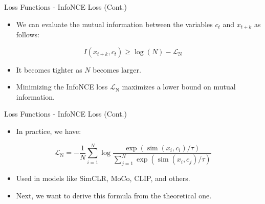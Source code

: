 \documentclass[serif, aspectratio=169]{beamer}
\begin{document}
\begin{frame}{Loss Functions - InfoNCE Loss (Cont.)}
     \begin{itemize}
         \item We can evaluate the mutual information between the variables $c_t$ and $x_{t+k}$ as follows:
     \end{itemize}

     \begin{equation*}
         I\left(x_{t+k}, c_t\right) \geq \log (N)-\mathcal{L}_{\mathrm{N}}
     \end{equation*}

     \begin{itemize}
         \item It becomes tighter as $N$ becomes larger.
         \item Minimizing the InfoNCE loss $\mathcal{L}_{\mathrm{N}}$ maximizes a lower bound on mutual information.
     \end{itemize}
\end{frame}


\begin{frame}{Loss Functions - InfoNCE Loss (Cont.)}
     \begin{itemize}
         \item In practice, we have:
     \end{itemize}

     \begin{equation*}
         \mathcal{L}_{\mathrm{N}}=-\frac{1}{N} \sum_{i=1}^N \log \frac{\exp \left(\operatorname{sim}\left(x_i, c_i\right) / \tau\right)}{\sum_{j=1}^N \exp \left(\operatorname{sim}\left(x_i, c_j\right) / \tau\right)}
     \end{equation*}

     \begin{itemize}
         \item Used in models like SimCLR, MoCo, CLIP, and others.
         \item Next, we want to derive this formula from the theoretical one.
     \end{itemize}
\end{frame}
\end{document}
